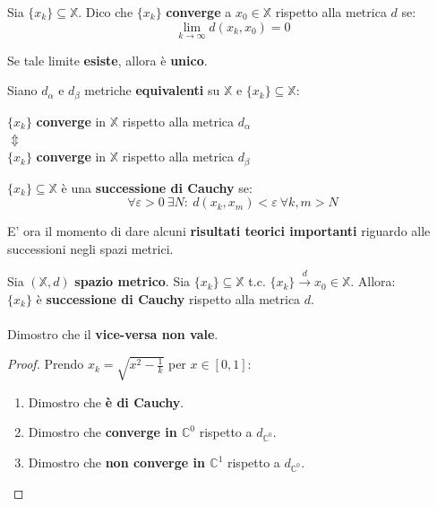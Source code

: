 \documentclass[a4paper, oneside]{article}
\newcommand\X{\mathbb{X}}
\newcommand\C{\mathbb{C}}
\begin{document}
\begin{definition}
    Sia $\{x_k\}\subseteq\X$. Dico che $\{x_k\}$ \textbf{converge} a $x_0\in\X$ rispetto alla metrica $d$ se:
    \[\lim_{k\to\infty} d(x_k,x_0) = 0\]
\end{definition}

\begin{observation}
    Se tale limite \textbf{esiste}, allora è \textbf{unico}.
\end{observation}

\begin{observation}
    Siano $d_\alpha$ e $d_\beta$ metriche \textbf{equivalenti} su $\X$ e $\{x_k\}\subseteq\X$:
    \begin{center}
        $\{x_k\}$ \textbf{converge} in $\X$ rispetto alla metrica $d_\alpha$\\
        $\Updownarrow$\\
        $\{x_k\}$ \textbf{converge} in $\X$ rispetto alla metrica $d_\beta$\\
    \end{center}
\end{observation}

\begin{definition}
    $\{x_k\}\subseteq\X$ è una \textbf{successione di Cauchy} se:
    \[\forall \varepsilon>0 \ \exists N: \ d(x_k,x_m) <\varepsilon \ \forall k,m > N\]
\end{definition}

\noindent E' ora il momento di dare alcuni \textbf{risultati teorici importanti} riguardo alle successioni negli spazi metrici. 
\begin{theorem}
    Sia $(\X,d)$ \textbf{spazio metrico}. Sia $\{x_k\}\subseteq\X$ t.c. $\{x_k\}\overset{d}{\longrightarrow}x_0\in\X$. Allora: \\
    $\{x_k\}$ è \textbf{successione di Cauchy} rispetto alla metrica $d$. \\\\
    Dimostro che il \textbf{vice-versa non vale}. 

    \begin{proof}
    Prendo $x_k = \sqrt{x^2 - \frac{1}{k}}$ per $x\in[0,1]$:
    \begin{enumerate}
        \item Dimostro che \textbf{è di Cauchy}.
        \item Dimostro che \textbf{converge in $\C^0$} rispetto a $d_{\C^0}$.
        \item Dimostro che \textbf{non converge in $\C^1$} rispetto a $d_{\C^0}$.
    \end{enumerate}
    \end{proof}
\end{theorem}
\end{document}
